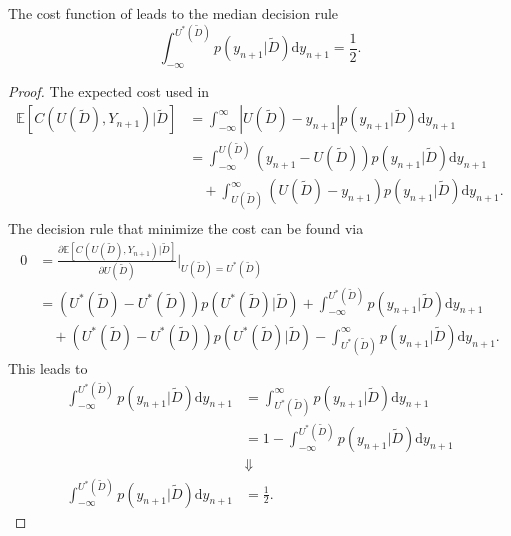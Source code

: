 \begin{theorem}
	\label{theorem:median_decision_rule}
	The cost function of  leads to the median decision rule
	\begin{equation}
		\int_{-\infty}^{U^*(\tilde{D})} p(y_{n+1}|\tilde{D})\mathrm{d}y_{n+1} = \frac{1}{2}.
	\end{equation}
\end{theorem}

\begin{proof}
	The expected cost used in 
	\begin{equation}
		\begin{split}
			\mathbb{E}[C(U(\tilde{D}), Y_{n+1})|\tilde{D}] &= \int_{-\infty}^{\infty} |U(\tilde{D})-y_{n+1}| p(y_{n+1}|\tilde{D})\mathrm{d}y_{n+1}\\
			&= \int_{-\infty}^{U(\tilde{D})} (y_{n+1}-U(\tilde{D}))p(y_{n+1}|\tilde{D})\mathrm{d}y_{n+1}\\
			&\quad+\int_{U(\tilde{D})}^\infty  (U(\tilde{D})-y_{n+1})p(y_{n+1}|\tilde{D})\mathrm{d}y_{n+1}.\\
		\end{split}
	\end{equation}
	The decision rule that minimize the cost can be found via
	\begin{equation}
		\begin{split}
			0 &=\frac{\partial \mathbb{E}[C(U(\tilde{D}), Y_{n+1})|\tilde{D}]}{\partial U(\tilde{D})}\bigg|_{U(\tilde{D})=U^*(\tilde{D})}\\
			&= (U^*(\tilde{D})-U^*(\tilde{D}))p(U^*(\tilde{D})|\tilde{D})+\int_{-\infty}^{U^*(\tilde{D})} p(y_{n+1}|\tilde{D})\mathrm{d}y_{n+1}\\
			&\quad+(U^*(\tilde{D})-U^*(\tilde{D}))p(U^*(\tilde{D})|\tilde{D})-\int_{U^*(\tilde{D})}^\infty  p(y_{n+1}|\tilde{D})\mathrm{d}y_{n+1}.
		\end{split}
	\end{equation}
	This leads to
	\begin{equation}
		\begin{split}
			\int_{-\infty}^{U^*(\tilde{D})} p(y_{n+1}|\tilde{D}) \mathrm{d}y_{n+1} &= \int_{U^*(\tilde{D})}^\infty p(y_{n+1}|\tilde{D}) \mathrm{d}y_{n+1}\\
			&= 1- \int_{-\infty}^{U^*(\tilde{D})} p(y_{n+1}|\tilde{D})\mathrm{d}y_{n+1}\\
			&\Downarrow\\
			\int_{-\infty}^{U^*(\tilde{D})} p(y_{n+1}|\tilde{D})\mathrm{d}y_{n+1}& = \frac{1}{2}.
		\end{split}
	\end{equation}	
\end{proof}

